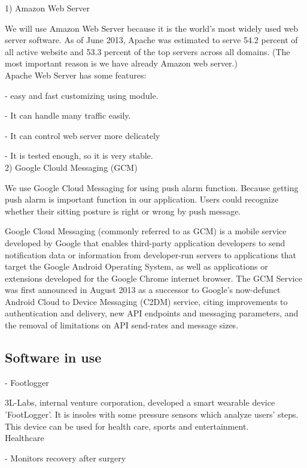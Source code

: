 \documentclass[conference]{IEEEtran}
\begin{document}
1) Amazon Web Server

 We will use Amazon Web Server because it is the world's most widely used web server software. As of June 2013, Apache was estimated to serve 54.2 percent of all active website and 53.3 percent of the top servers across all domains. (The most important reason is we have already Amazon web server.)\\

Apache Web Server has some features:

- easy and fast customizing using module.

- It can handle many traffic easily.

- It can control web server more delicately

- It is tested enough, so it is very stable.\\

2) Google Clould Messaging (GCM)

 We use Google Cloud Messaging for using push alarm function. Because getting push alarm is important function in our application. Users could recognize whether their sitting posture is right or wrong by push message.  

Google Cloud Messaging (commonly referred to as GCM) is a mobile service developed by Google that enables third-party application developers to send notification data or information from developer-run servers to applications that target the Google Android Operating System, as well as applications or extensions developed for the Google Chrome internet browser. The GCM Service was first announced in August 2013 as a successor to Google's now-defunct Android Cloud to Device Messaging (C2DM) service, citing improvements to authentication and delivery, new API endpoints and messaging parameters, and the removal of limitations on API send-rates and message sizes.

\subsection{Software in use}

-	Footlogger

3L-Labs, internal venture corporation, developed a smart wearable device 'FootLogger'. It is insoles with some pressure sensors which analyze users' steps. This device can be used for health care, sports and entertainment.\\

Healthcare

- Monitors recovery after surgery
\end{document}
